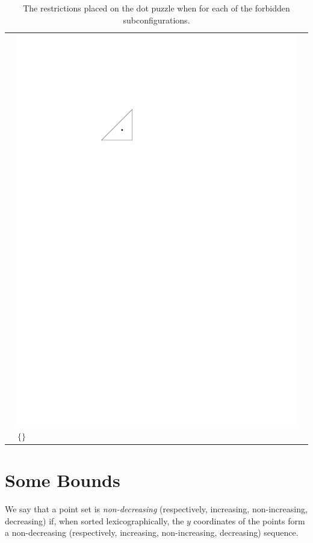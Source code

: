 \documentclass{patmorin}
\begin{document}
\begin{table}
\begin{center}
\begin{tabular}{m{1ex}|>{\centering\arraybackslash}m{}|>{\centering\arraybackslash}m{}}
         & \includegraphics[scale=.8]{figs/killersb-8} \break%
           $\{\}$ \\
\end{tabular}
\end{center}
   \caption{The restrictions placed on the dot puzzle when for each of 
     the forbidden subconfigurations.}
\end{table}
\section{Some Bounds}

We say that a point set is \emph{non-decreasing} (respectively,
increasing, non-increasing, decreasing) if, when sorted lexicographically,
the $y$ coordinates of the points form a non-decreasing (respectively,
increasing, non-increasing, decreasing) sequence.
\end{document}
